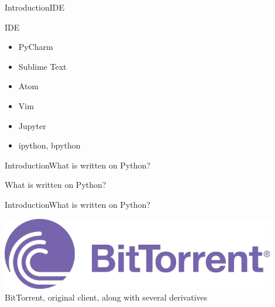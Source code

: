\documentclass[10pt]{beamer}
\begin{document}
\begin{frame}[fragile]{Introduction}{IDE}
	
	\begin{block}{IDE}
		\begin{itemize}
			
			\item PyCharm
			
			\item Sublime Text
			
			\item Atom
			
			\item Vim
			
			\item Jupyter
			
			\item ipython, bpython
		\end{itemize}
	\end{block}	
	
\end{frame}

\begin{frame}{Introduction}{What is written on Python?}
	\begin{center}
		\Huge What is written on Python?
	\end{center}
\end{frame}

\begin{frame}{Introduction}{What is written on Python?}
	\begin{center}
		\includegraphics[width=0.9\textwidth]{pictures/bit_torrent.png}
		\large{\\BitTorrent, original client, along with several derivatives}
	\end{center}
\end{frame}
\end{document}
